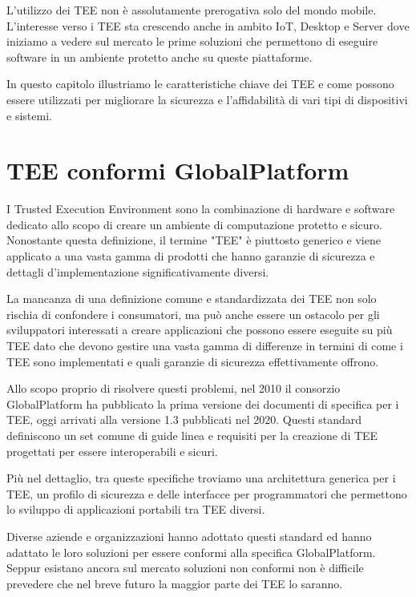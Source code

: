 \documentclass[12pt,italian]{report}
\begin{document}
L'utilizzo dei TEE non è assolutamente prerogativa solo del mondo mobile.
L'interesse verso i TEE sta crescendo anche in ambito IoT, Desktop e Server 
dove iniziamo a vedere sul mercato le prime soluzioni che permettono di
eseguire software in un ambiente protetto anche su queste piattaforme.

In questo capitolo illustriamo le caratteristiche chiave dei TEE e come
possono essere utilizzati per migliorare la sicurezza e l'affidabilità di
vari tipi di dispositivi e sistemi.

\section{TEE conformi GlobalPlatform}
\label{sec:tee-conformi-globalplatform}
I Trusted Execution Environment sono la combinazione di hardware e software
dedicato allo scopo di creare un ambiente di computazione protetto e sicuro.
Nonostante questa definizione, il termine "TEE" è piuttosto generico
e viene applicato a una vasta gamma di prodotti che hanno garanzie di sicurezza
e dettagli d'implementazione significativamente diversi.

La mancanza di una definizione comune e standardizzata dei TEE non solo rischia
di confondere i consumatori, ma può anche essere un ostacolo per gli sviluppatori
interessati a creare applicazioni che possono essere eseguite su più TEE
dato che devono gestire una vasta gamma di differenze in termini di come i
TEE sono implementati e quali garanzie di sicurezza effettivamente offrono.

Allo scopo proprio di risolvere questi problemi, nel 2010 il consorzio
GlobalPlatform ha pubblicato la prima versione dei documenti di specifica
per i TEE, oggi arrivati alla versione 1.3 pubblicati nel 2020.
Questi standard definiscono un set comune di guide linea e requisiti per la
creazione di TEE progettati per essere interoperabili e sicuri.

Più nel dettaglio, tra queste specifiche troviamo una architettura
generica per i TEE, un profilo di sicurezza e delle interfacce per
programmatori che permettono lo sviluppo di applicazioni portabili tra TEE
diversi. 

Diverse aziende e organizzazioni hanno adottato questi standard
ed hanno adattato le loro soluzioni per essere conformi alla specifica
GlobalPlatform.
Seppur esistano ancora sul mercato soluzioni non conformi non è difficile
prevedere che nel breve futuro la maggior parte dei TEE lo saranno.
\end{document}

